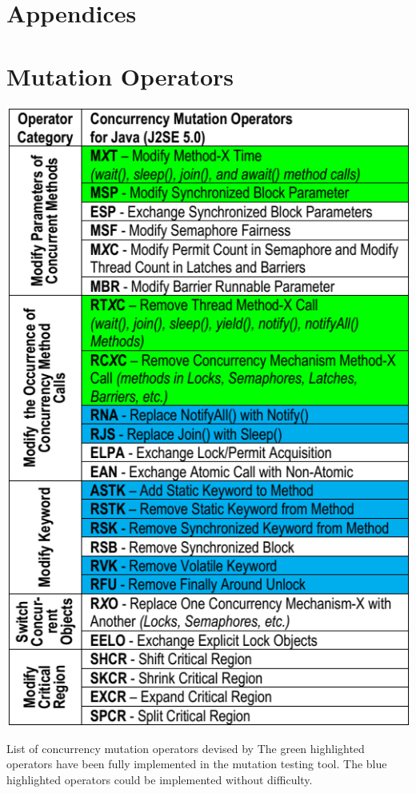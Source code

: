 \documentclass[a4paper,12pt]{article}
\begin{document}
\newpage
\section{Appendices} \label{section:Appendices}

\appendix
\section{Mutation Operators} \label{appendix:Mutation Operators}

\begin{table}[h]
    \centering
    \includegraphics[scale = 0.65]{MO_categories.png}
    \caption{List of concurrency mutation operators devised by \citet{bradbury06} The green highlighted operators have been fully implemented in the mutation testing tool. The blue highlighted operators could be implemented without difficulty.}
    \label{table:MO_cat}
\end{table}
\end{document}
